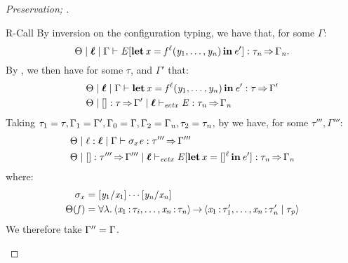 \begin{proof}[Preservation; ]
\begin{rneqncase}{R-Call}
    By inversion on the configuration typing, we have that, for some $\Gamma$:
    \[
       \Theta   \mid   \oldvec{\ell}   \mid   \Gamma   \vdash   \ottnt{E}  \ottsym{[}   \LET  \mathit{x}  =   \mathit{f} ^ \ell (  \mathit{y_{{\mathrm{1}}}} ,\ldots, \mathit{y_{\ottmv{n}}}  )   \IN  \ottnt{e'}   \ottsym{]}  :  \tau_{\ottmv{n}}   \produces   \Gamma_{\ottmv{n}}  .
    \]
    By , we then have for some $\tau$, and $\Gamma'$ that:
    \begin{align*}
      &  \Theta   \mid   \oldvec{\ell}   \mid   \Gamma   \vdash    \LET  \mathit{x}  =   \mathit{f} ^ \ell (  \mathit{y_{{\mathrm{1}}}} ,\ldots, \mathit{y_{\ottmv{n}}}  )   \IN  \ottnt{e'}   :  \tau   \produces   \Gamma'  \\
      & \Theta  \mid  \HOLE  \ottsym{:}  \tau  \produces  \Gamma'  \mid  \oldvec{\ell}  \vdash_{\mathit{ectx} }  \ottnt{E}  \ottsym{:}  \tau_{\ottmv{n}}  \produces  \Gamma_{\ottmv{n}}
    \end{align*}
    Taking $\tau_{{\mathrm{1}}}  =  \tau, \Gamma_{{\mathrm{1}}}  =  \Gamma', \Gamma_{{\mathrm{0}}}  =  \Gamma, \Gamma_{{\mathrm{2}}}  =  \Gamma_{\mathit{n}}, \tau_{{\mathrm{2}}}  =  \tau_{\mathit{n}}$,
    by  we have, for some $\tau''', \Gamma'''$:
    \begin{align*}
      &  \Theta   \mid   \ell  \ottsym{:}  \oldvec{\ell}   \mid   \Gamma   \vdash    \sigma_{x}   \ottnt{e}   :  \tau'''   \produces   \Gamma'''  \\
      & \Theta  \mid  \HOLE  \ottsym{:}  \tau'''  \produces  \Gamma'''  \mid  \oldvec{\ell}  \vdash_{\mathit{ectx} }   \ottnt{E} [\LET  \mathit{x}  =   \HOLE^ \ell   \IN  \ottnt{e'}  ]   \ottsym{:}  \tau_{\ottmv{n}}  \produces  \Gamma_{\ottmv{n}}
    \end{align*}
    where:
    \begin{align*}
      \sigma_{x} & =   [  \mathit{y_{{\mathrm{1}}}}  /  \mathit{x_{{\mathrm{1}}}}  ]  \cdots  [  \mathit{y_{\mathit{n}}}  /  \mathit{x_{\mathit{n}}}  ]   \\
      \Theta  (  \mathit{f}  ) & =  \forall  \lambda .\left\langle{ \mathit{x_{{\mathrm{1}}}} \operatorname{:}\tau_{\mathit{i}} ,\dots, \mathit{x_{\mathit{n}}} \operatorname{:}\tau_{\mathit{n}} }\right\rangle\operatorname{\rightarrow}\left\langle{ \mathit{x_{{\mathrm{1}}}} \operatorname{:}\tau'_{{\mathrm{1}}} ,\dots, \mathit{x_{\mathit{n}}} \operatorname{:}\tau'_{\mathit{n}}  \mid  \tau_{\mathit{p}} }\right\rangle 
    \end{align*}
    We therefore take $\Gamma''  =  \Gamma$.
     

\end{rneqncase}
\end{proof}
